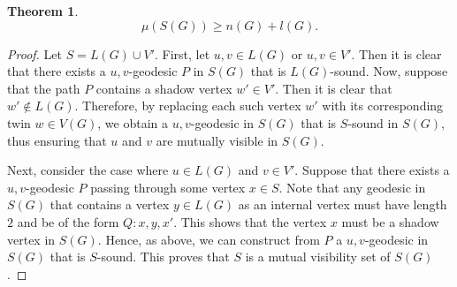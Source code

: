 \documentclass[a4paper,12pt]{article}
\newtheorem{theorem}{Theorem}[section]
\begin{document}
{\begin{theorem}
$$ \mu(S(G)) \geq n(G) + l(G).$$

\end{theorem}
\begin{proof}
Let $S = L(G) \cup V'$. First, let $u, v \in L(G)$ or $u, v \in V'$. Then it is clear that there exists a $u,v$-geodesic $P$ in $S(G)$ that is $L(G)$-sound. Now, suppose that the path $P$ contains a shadow vertex $w' \in V'$. Then it is clear that $w' \notin L(G)$. Therefore, by replacing each such vertex $w'$ with its corresponding twin $w \in V(G)$, we obtain a $u,v$-geodesic in $S(G)$ that is $S$-sound in $S(G)$, thus ensuring that $u$ and $v$ are mutually visible in $S(G)$.

Next, consider the case where $u \in L(G)$ and $v \in V'$. Suppose that there exists a $u,v$-geodesic $P$ passing through some vertex $x \in S$. Note that any geodesic in $S(G)$ that contains a vertex $y \in L(G)$ as an internal vertex must have length $2$ and be of the form $Q : x, y, x'$. This shows that the vertex $x$ must be a shadow vertex in $S(G)$. Hence, as above, we can construct from $P$ a $u,v$-geodesic in $S(G)$ that is $S$-sound. This proves that $S$ is a mutual visibility set of $S(G)$.

\end{proof} 
 
}
\end{document}
